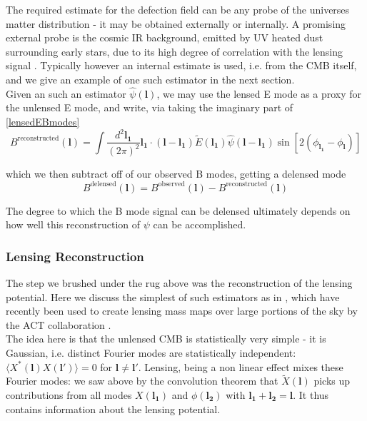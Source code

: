 \documentclass[a4paper,10pt]{article}
\renewcommand{\v}[1]{\mathbf{#1}}
\newcommand{\finttwo}[1]{\int \frac{d^2 \v{#1}}{(2\pi)^2}}
\begin{document}
The required estimate for the defection field can be any probe of the universes matter distribution -  it may be obtained externally or internally. A promising external probe is the cosmic IR background, emitted by UV heated dust surrounding early stars, due to its high degree of correlation with the lensing signal \cite{sherwin}. Typically however an internal estimate is used, i.e. from the CMB itself, and we give an example of one such estimator in the next section. \\

Given an such an estimator $\hat{\psi}(\v{l})$, we may use the lensed E mode as a proxy for the unlensed E mode, and write, via taking the imaginary part of \ref{lensedEBmodes}
\begin{equation}
B^{\text{reconstructed}}(\v{l}) = \finttwo{l_1} \v{l_1}\cdot(\v{l}-\v{l_1}) \tilde{E}(\v{l_1})\hat{\psi}(\v{l}-\v{l_1})\sin[2(\phi_\v{l_1}-\phi_\v{l})]
\label{sin}
\end{equation} 

which we then subtract off of our observed B modes, getting a delensed mode
\begin{equation}
B^{\text{delensed}}(\v{l}) = B^{\text{observed}}(\v{l}) - B^{\text{reconstructed}}(\v{l})
\end{equation}

The degree to which the B mode signal can be delensed ultimately depends on how well this reconstruction of $\psi$ can be accomplished. 

\subsubsection{Lensing Reconstruction}

The step we brushed under the rug above was the reconstruction of the lensing potential. Here we discuss the simplest of such estimators as in \cite{hu-estimator,lewis}, which have recently been used to create lensing mass maps over large portions of the sky by the ACT collaboration \cite{darwish}. \\

The idea here is that the unlensed CMB is statistically very simple - it is Gaussian, i.e. distinct Fourier modes are statistically independent: $\langle X^*(\v{l})X(\v{l'})\rangle =0$ for  $\v{l} \neq \v{l'}$. Lensing, being a non linear effect mixes these Fourier modes: we saw above by the convolution theorem that  $\tilde{X}(\v{l})$ picks up contributions from all modes ${X}(\v{l_1})$ and $\phi(\v{l_2})$ with $\v{l_1}+\v{l_2}=\v{l}$. It thus contains information about the lensing potential.\\
\end{document}
